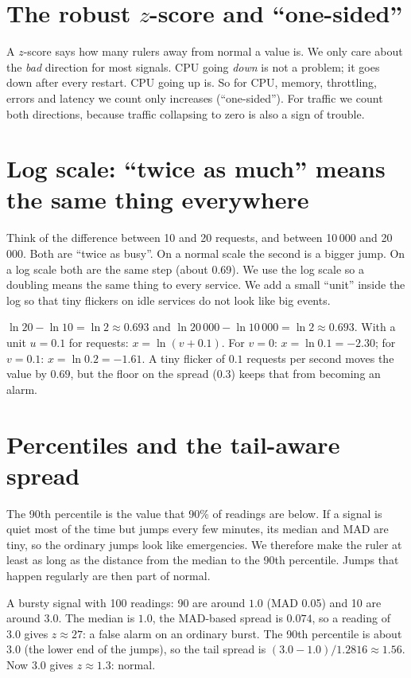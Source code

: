 \section{The robust $z$-score and ``one-sided''}
\begin{simplebox}
A $z$-score says how many rulers away from normal a value is. We only care about the \emph{bad} direction for most signals. CPU going \emph{down} is not a problem; it goes down after every restart. CPU going up is. So for CPU, memory, throttling, errors and latency we count only increases (``one-sided''). For traffic we count both directions, because traffic collapsing to zero is also a sign of trouble.
\end{simplebox}

\section{Log scale: ``twice as much'' means the same thing everywhere}
\begin{simplebox}
Think of the difference between 10 and 20 requests, and between 10\,000 and 20\,000. Both are ``twice as busy''. On a normal scale the second is a bigger jump. On a log scale both are the same step (about 0.69). We use the log scale so a doubling means the same thing to every service. We add a small ``unit'' inside the log so that tiny flickers on idle services do not look like big events.
\end{simplebox}
\begin{examplebox}[Check it]
$\ln 20-\ln 10=\ln 2\approx0.693$ and $\ln 20\,000-\ln 10\,000=\ln 2\approx0.693$. With a unit $u=0.1$ for requests: $x=\ln(v+0.1)$. For $v=0$: $x=\ln 0.1=-2.30$; for $v=0.1$: $x=\ln 0.2=-1.61$. A tiny flicker of $0.1$ requests per second moves the value by $0.69$, but the floor on the spread (0.3) keeps that from becoming an alarm.
\end{examplebox}

\section{Percentiles and the tail-aware spread}
\begin{simplebox}
The 90th percentile is the value that 90\% of readings are below. If a signal is quiet most of the time but jumps every few minutes, its median and MAD are tiny, so the ordinary jumps look like emergencies. We therefore make the ruler at least as long as the distance from the median to the 90th percentile. Jumps that happen regularly are then part of normal.
\end{simplebox}
\begin{examplebox}[Check it]
A bursty signal with 100 readings: 90 are around $1.0$ (MAD 0.05) and 10 are around $3.0$. The median is $1.0$, the MAD-based spread is $0.074$, so a reading of $3.0$ gives $z\approx27$: a false alarm on an ordinary burst. The 90th percentile is about $3.0$ (the lower end of the jumps), so the tail spread is $(3.0-1.0)/1.2816\approx1.56$. Now $3.0$ gives $z\approx1.3$: normal.
\end{examplebox}

